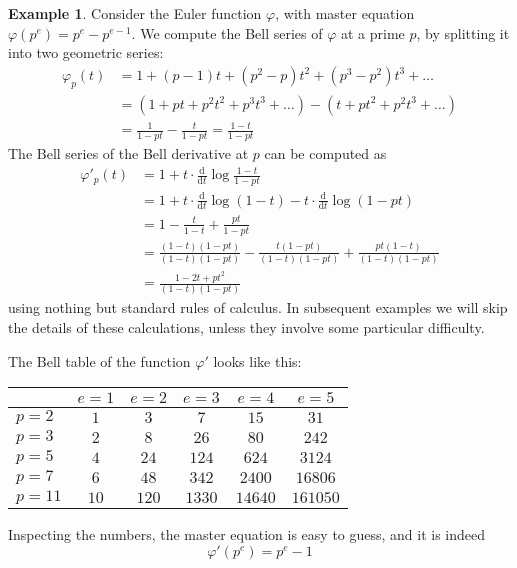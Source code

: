\documentclass[a4paper]{article}
\theoremstyle{definition}
\newtheorem{example}{Example}[section]
\theoremstyle{remark}
\begin{document}
\begin{example}
Consider the Euler function $\varphi$, with master equation $\varphi(p^e) = p^e - p^{e-1}$. We compute the Bell series of $\varphi$ at a prime $p$, by splitting it into two geometric series:
\begin{equation} \label{EulerBellSeries}
\begin{split}
\varphi_p(t) & = 1 + (p-1)t + (p^2-p ) t^2 + (p^3-p^2)t^3 + \ldots \\
 & = (1+pt+p^2t^2 + p^3 t^3 + \ldots) - (t + pt^2 + p^2 t^3 + \ldots) \\
 & = \frac{1}{1-pt} - \frac{t}{1-pt} = \frac{1-t}{1-pt} 
\end{split}
\end{equation} 
The Bell series of the Bell derivative at $p$ can be computed as
\begin{equation} \label{EulerDerivativeBellSeries}
\begin{split}
\varphi'_p(t) & = 1 + t \cdot \frac{\mathrm{d}}{\mathrm{d}t} \log \frac{1-t}{1-pt} \\
 & = 1 + t \cdot \frac{\mathrm{d}}{\mathrm{d}t} \log (1-t) -  t \cdot \frac{\mathrm{d}}{\mathrm{d}t} \log (1-pt)  \\
 & = 1 - \frac{t}{1-t} + \frac{pt}{1-pt} \\
 & = \frac{(1-t)(1-pt)}{(1-t)(1-pt)} - \frac{t(1-pt)}{(1-t)(1-pt)}  + \frac{pt (1-t)}{(1-t)(1-pt)}  \\
 & = \frac{1-2t+pt^2}{(1-t)(1-pt)} 
\end{split}
\end{equation} 
using nothing but standard rules of calculus. In subsequent examples we will skip the details of these calculations, unless they involve some particular difficulty.

The Bell table of the function $\varphi'$ looks like this:
\vskip10pt
\begin{center}
\begin{tabular}{| l | | c | c | c | c | c |}
\hline
& $e = 1$ & $e = 2$ & $e = 3$ & $e = 4$ & $e = 5$\\
\hline
\hline
$p = 2$ & $1$ & $3$ & $7$ & $15$ & $31$ \\
\hline
$p = 3$ & $2$ & $8$ & $26$ & $80$ & $242$ \\
\hline
$p = 5$ & $4$ & $24$ & $124$ & $624$ & $3124$ \\
\hline
$p = 7$ & $6$ & $48$ & $342$ & $2400$ & $16806$ \\
\hline
$p = 11$ & $10$ & $120$ & $1330$ & $14640$ & $161050$ \\
\hline
\end{tabular}
\end{center}
Inspecting the numbers, the master equation is easy to guess, and it is indeed
$$ \varphi'(p^e) = p^e -1   $$
\end{example}
\end{document}
